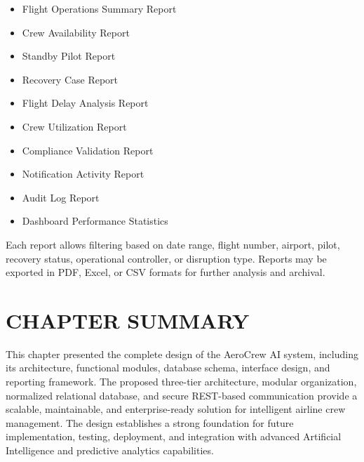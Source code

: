 \documentclass[12pt,a4paper]{report}
\begin{document}
\begin{itemize}

\item Flight Operations Summary Report

\item Crew Availability Report

\item Standby Pilot Report

\item Recovery Case Report

\item Flight Delay Analysis Report

\item Crew Utilization Report

\item Compliance Validation Report

\item Notification Activity Report

\item Audit Log Report

\item Dashboard Performance Statistics

\end{itemize}

Each report allows filtering based on date range, flight number, airport, pilot, recovery status, operational controller, or disruption type. Reports may be exported in PDF, Excel, or CSV formats for further analysis and archival.

\section*{CHAPTER SUMMARY}

This chapter presented the complete design of the AeroCrew AI system, including its architecture, functional modules, database schema, interface design, and reporting framework. The proposed three-tier architecture, modular organization, normalized relational database, and secure REST-based communication provide a scalable, maintainable, and enterprise-ready solution for intelligent airline crew management. The design establishes a strong foundation for future implementation, testing, deployment, and integration with advanced Artificial Intelligence and predictive analytics capabilities.

\end{document}
